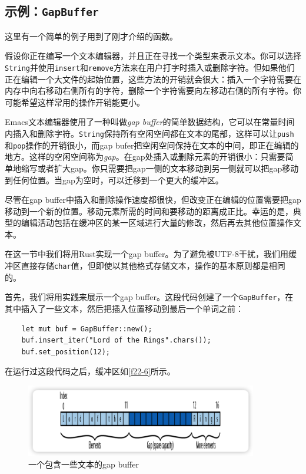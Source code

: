 \subsection{示例：\texttt{GapBuffer}}
这里有一个简单的例子用到了刚才介绍的函数。

假设你正在编写一个文本编辑器，并且正在寻找一个类型来表示文本。你可以选择\texttt{String}并使用\texttt{insert}和\texttt{remove}方法来在用户打字时插入或删除字符。但如果他们正在编辑一个大文件的起始位置，这些方法的开销就会很大：插入一个字符需要在内存中向右移动右侧所有的字符，删除一个字符需要向左移动右侧的所有字符。你可能希望这样常用的操作开销能更小。

Emacs文本编辑器使用了一种叫做\emph{gap buffer}的简单数据结构，它可以在常量时间内插入和删除字符。\texttt{String}保持所有空闲空间都在文本的尾部，这样可以让\texttt{push}和\texttt{pop}操作的开销很小，而gap bufer把空闲空间保持在文本的中间，即正在编辑的地方。这样的空闲空间称为\emph{gap}。在gap处插入或删除元素的开销很小：只需要简单地缩写或者扩大gap。你只需要把gap一侧的文本移动到另一侧就可以把gap移动到任何位置。当gap为空时，可以迁移到一个更大的缓冲区。

尽管在gap buffer中插入和删除操作速度都很快，但改变正在编辑的位置需要把gap移动到一个新的位置。移动元素所需的时间和要移动的距离成正比。幸运的是，典型的编辑活动包括在缓冲区的某一区域进行大量的修改，然后再去其他位置操作文本。

在这一节中我们将用Rust实现一个gap buffer。为了避免被UTF-8干扰，我们用缓冲区直接存储\texttt{char}值，但即使以其他格式存储文本，操作的基本原则都是相同的。

首先，我们将用实践来展示一个gap buffer。这段代码创建了一个\texttt{GapBuffer}，在其中插入了一些文本，然后把插入位置移动到最后一个单词之前：
\begin{verbatim}
    let mut buf = GapBuffer::new();
    buf.insert_iter("Lord of the Rings".chars());
    buf.set_position(12);
\end{verbatim}

在运行过这段代码之后，缓冲区如\autoref{f22-6}所示。
\begin{figure}[htbp]
    \centering
    \includegraphics[width=0.9\textwidth]{../img/f22-6.png}
    \caption{一个包含一些文本的gap buffer}
    \label{f22-6}
\end{figure}

